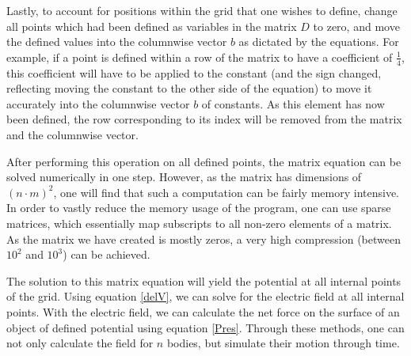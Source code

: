 \documentclass[journal]{IEEEtran}
\begin{document}
Lastly, to account for positions within the grid that one wishes to define, change all points which had been defined as variables in the matrix $D$ to zero, and move the defined values into the columnwise vector $b$ as dictated by the equations.  For example, if a point is defined within a row of the matrix to have a coefficient of $\frac{1}{4}$, this coefficient will have to be applied to the constant (and the sign changed, reflecting moving the constant to the other side of the equation) to move it accurately into the columnwise vector $b$ of constants.  As this element has now been defined, the row corresponding to its index will be removed from the matrix and the columnwise vector.

After performing this operation on all defined points, the matrix equation can be solved numerically in one step.  However, as the matrix has dimensions of ${(n \cdot m)}^2$, one will find that such a computation can be fairly memory intensive.  In order to vastly reduce the memory usage of the program, one can use sparse matrices, which essentially map subscripts to all non-zero elements of a matrix.  As the matrix we have created is mostly zeros, a very high compression (between $10^2$ and $10^3$) can be achieved.

The solution to this matrix equation will yield the potential at all internal points of the grid.  Using equation \ref{delV}, we can solve for the electric field at all internal points.  With the electric field, we can calculate the net force on the surface of an object of defined potential using equation \ref{Pres}.  Through these methods, one can not only calculate the field for $n$ bodies, but simulate their motion through time.

%
%
\end{document}
